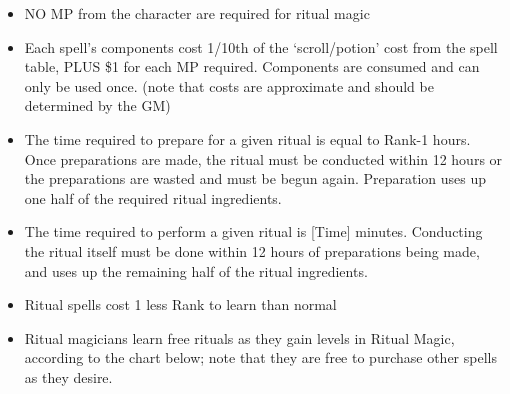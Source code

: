 \documentclass[twoside]{book}
\begin{document}
\begin{itemize}
      
  \item   NO MP from the character are required for ritual
                 magic 
  \item   Each spell's components cost 1/10th of the
                 `scroll/potion' cost from the spell table,
                 PLUS \$1 for each MP required. Components are consumed
                 and can only be used once. (note that costs are
                 approximate and should be determined by the GM) 
  \item   The time required to prepare for a given ritual
                 is equal to Rank-1 hours. Once preparations are made,
                 the ritual must be conducted within 12 hours or the
                 preparations are wasted and must be begun again.
                 Preparation uses up one half of the required ritual
                 ingredients. 
  \item   The time required to perform a given ritual is
                 [Time] minutes. Conducting the ritual itself must be
                 done within 12 hours of preparations being made, and
                 uses up the remaining half of the ritual ingredients.
                 
  \item   Ritual spells cost 1 less Rank to learn than
                 normal 
  \item   Ritual magicians learn free rituals as they gain
                 levels in Ritual Magic, according to the chart below;
                 note that they are free to purchase other spells as they
                 desire. 
\end{itemize}
  
\end{document}

